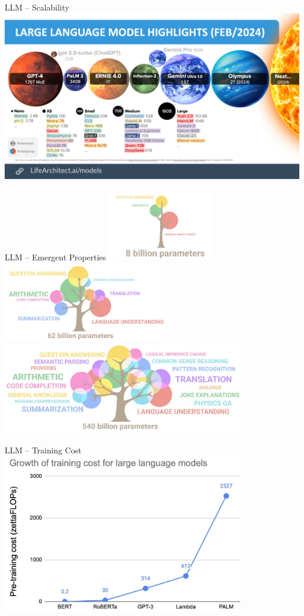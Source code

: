 \documentclass[presentation, 10pt]{beamer}\mode<presentation>{\usetheme{AMSBolognaFC}}
\begin{document}
\begin{frame}{LLM -- Scalability}
	\includegraphics[width=\textwidth]{img/image-size.png}
\end{frame}
\begin{frame}{LLM -- Emergent Properties}
\includegraphics[width=0.35\textwidth]{img/small.jpg}
\includegraphics[width=0.55\textwidth]{img/medium.jpg}
\centering
\includegraphics[width=0.8\textwidth]{img/big.jpg}

\end{frame}
\begin{frame}{LLM -- Training Cost}
\centering
\includegraphics[width=0.8\textwidth]{img/training-cost.jpg}
\end{frame}
\end{document}
